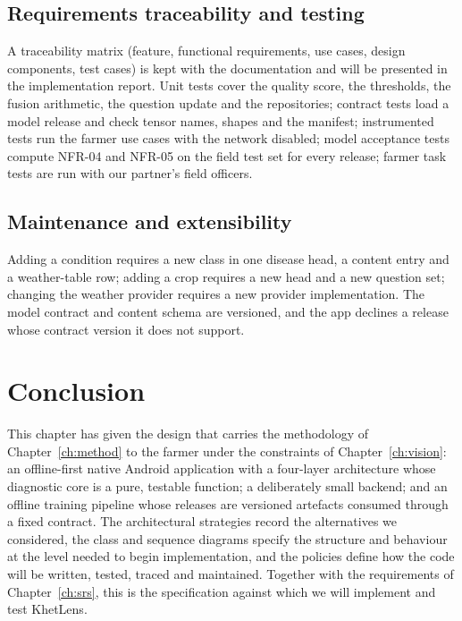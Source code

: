 \subsection{Requirements traceability and testing}
A traceability matrix (feature, functional requirements, use cases, design components, test cases) is kept with the documentation and will be presented in the implementation report. Unit tests cover the quality score, the thresholds, the fusion arithmetic, the question update and the repositories; contract tests load a model release and check tensor names, shapes and the manifest; instrumented tests run the farmer use cases with the network disabled; model acceptance tests compute NFR-04 and NFR-05 on the field test set for every release; farmer task tests are run with our partner's field officers.

\subsection{Maintenance and extensibility}
Adding a condition requires a new class in one disease head, a content entry and a weather-table row; adding a crop requires a new head and a new question set; changing the weather provider requires a new provider implementation. The model contract and content schema are versioned, and the app declines a release whose contract version it does not support.

\section{Conclusion}
This chapter has given the design that carries the methodology of Chapter~\ref{ch:method} to the farmer under the constraints of Chapter~\ref{ch:vision}: an offline-first native Android application with a four-layer architecture whose diagnostic core is a pure, testable function; a deliberately small backend; and an offline training pipeline whose releases are versioned artefacts consumed through a fixed contract. The architectural strategies record the alternatives we considered, the class and sequence diagrams specify the structure and behaviour at the level needed to begin implementation, and the policies define how the code will be written, tested, traced and maintained. Together with the requirements of Chapter~\ref{ch:srs}, this is the specification against which we will implement and test KhetLens.
